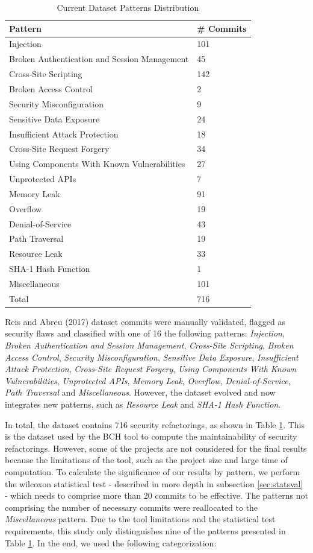 \documentclass[10pt,conference]{IEEEtran}
\begin{document}
\begin{table}[h]
	\centering
\caption{Current Dataset Patterns Distribution} \label{tab:patterns}
\begin{tabular}{@{}ll@{}}
\toprule
Pattern & \# Commits\\
\midrule
Injection & 101\\
Broken Authentication and Session Management& 45\\
Cross-Site Scripting& 142\\
Broken Access Control& 2\\
Security Misconfiguration& 9\\
Sensitive Data Exposure& 24\\
Insufficient Attack Protection& 18\\
Cross-Site Request Forgery& 34\\
Using Components With Known Vulnerabilities& 27\\
Unprotected APIs& 7\\
Memory Leak& 91\\
Overflow& 19\\
Denial-of-Service& 43\\
Path Traversal& 19\\
Resource Leak& 33\\
SHA-1 Hash Function & 1\\
Miscellaneous& 101\\\midrule
Total& 716\\
\bottomrule
\end{tabular}
\end{table}

Reis and Abreu (2017) dataset commits were manually validated, flagged as security flaws and classified with one of 16 the following patterns: \textit{Injection}, \textit{Broken Authentication and Session Management}, \textit{Cross-Site Scripting}, \textit{Broken Access Control}, \textit{Security Misconfiguration}, \textit{Sensitive Data Exposure}, \textit{Insufficient Attack Protection}, \textit{Cross-Site Request Forgery}, \textit{Using Components With Known Vulnerabilities}, \textit{Unprotected APIs}, \textit{Memory Leak}, \textit{Overflow}, \textit{Denial-of-Service}, \textit{Path Traversal} and \textit{Miscellaneous}. However, the dataset evolved and now integrates new patterns, such as \textit{Resource Leak} and \textit{SHA-1 Hash Function}.

In total, the dataset contains 716 security refactorings, as shown in Table \ref{tab:patterns}. This is the dataset used
by the BCH tool to compute the maintainability of security refactorings. However, some of the projects are not considered for
the final results because the limitations of the tool, such as the project size and large time of computation. To calculate the significance of our results by pattern, we perform the wilcoxon statistical test - described in more depth in subsection \ref{sec:statsval} - which needs to comprise more than 20 commits to be effective. The patterns not comprising the number of necessary commits were reallocated to the \textit{Miscellaneous} pattern. Due to the tool limitations and the statistical test requirements, this study only distinguishes nine of the patterns presented in Table \ref{tab:patterns}. In the
end, we used the following categorization:
\end{document}
